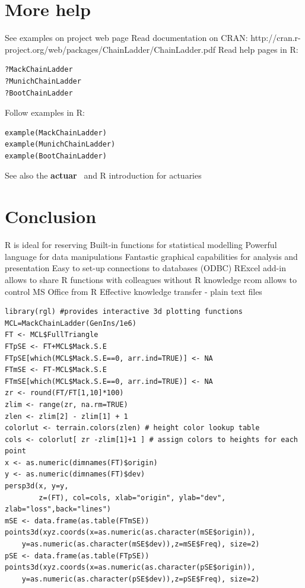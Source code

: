 \documentclass[a4paper]{article}
\newcommand{\pkg}[1]{\textbf{#1}}
\begin{document}
\section{More help}

See examples on project web page
Read documentation on CRAN: http://cran.r-project.org/web/packages/ChainLadder/ChainLadder.pdf
Read help pages in R:

\begin{verbatim}
?MackChainLadder
?MunichChainLadder
?BootChainLadder
\end{verbatim}
Follow examples in R:

\begin{verbatim}
example(MackChainLadder)
example(MunichChainLadder)
example(BootChainLadder)
\end{verbatim}

See also the \pkg{actuar}~\citep{actuar} and R introduction for actuaries~\citep{DeSilva}

\section{Conclusion}

R is ideal for reserving
Built-in functions for statistical modelling
Powerful language for data manipulations
Fantastic graphical capabilities for analysis and presentation
Easy to set-up connections to databases (ODBC)
RExcel add-in allows to share R functions with colleagues without R knowledge
rcom allows to control MS Office from R
Effective knowledge transfer - plain text files

\begin{verbatim}
library(rgl) #provides interactive 3d plotting functions
MCL=MackChainLadder(GenIns/1e6)
FT <- MCL$FullTriangle
FTpSE <- FT+MCL$Mack.S.E
FTpSE[which(MCL$Mack.S.E==0, arr.ind=TRUE)] <- NA
FTmSE <- FT-MCL$Mack.S.E
FTmSE[which(MCL$Mack.S.E==0, arr.ind=TRUE)] <- NA
zr <- round(FT/FT[1,10]*100)
zlim <- range(zr, na.rm=TRUE)
zlen <- zlim[2] - zlim[1] + 1
colorlut <- terrain.colors(zlen) # height color lookup table
cols <- colorlut[ zr -zlim[1]+1 ] # assign colors to heights for each point
x <- as.numeric(dimnames(FT)$origin)
y <- as.numeric(dimnames(FT)$dev)
persp3d(x, y=y,
        z=(FT), col=cols, xlab="origin", ylab="dev", zlab="loss",back="lines")
mSE <- data.frame(as.table(FTmSE))
points3d(xyz.coords(x=as.numeric(as.character(mSE$origin)),
    y=as.numeric(as.character(mSE$dev)),z=mSE$Freq), size=2)
pSE <- data.frame(as.table(FTpSE))
points3d(xyz.coords(x=as.numeric(as.character(pSE$origin)),
    y=as.numeric(as.character(pSE$dev)),z=pSE$Freq), size=2)

\end{verbatim}
\end{document}

